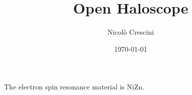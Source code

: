 \documentclass{article}
\title{Open Haloscope}
\author{Nicolò Crescini}
\date{\today}
\begin{document}
\maketitle

The electron spin resonance material is NiZn.
\end{document}
